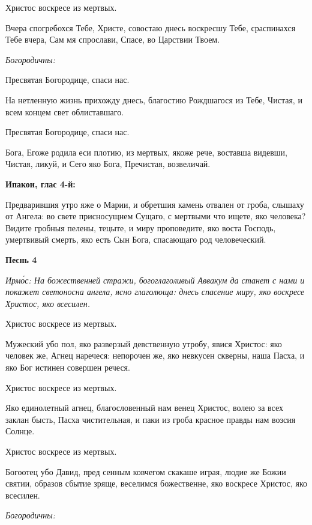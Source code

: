Христос воскресе из мертвых.


Вчера спогребохся Тебе, Христе, совостаю днесь воскресшу Тебе, сраспинахся Тебе вчера, Сам мя спрослави, Спасе, во Царствии Твоем.


\itshape Богородичны:

\normalfont{}


Пресвятая Богородице, спаси нас.


На нетленную жизнь прихожду днесь, благостию Рождшагося из Тебе, Чистая, и всем концем свет облиставшаго.


Пресвятая Богородице, спаси нас.


Бога, Егоже родила еси плотию, из мертвых, якоже рече, воставша видевши, Чистая, ликуй, и Сего яко Бога, Пречистая, возвеличай.





\bfseries Ипакои, глас 4-й:\normalfont{}


Предварившия утро яже о Марии, и обретшия камень отвален от гроба, слышаху от Ангела: во свете присносущнем Сущаго, с мертвыми что ищете, яко человека? Видите гробныя пелены, тецыте, и миру проповедите, яко воста Господь, умертвивый смерть, яко есть Сын Бога, спасающаго род человеческий.





\bfseries Песнь 4\normalfont{}


\itshape Ирмо́с:\normalfont{} На божественней стражи, богоглаголивый Аввакум да станет с нами и покажет светоносна ангела, ясно глаголюща: днесь спасение миру, яко воскресе Христос, яко всесилен.


Христос воскресе из мертвых.


Мужеский убо пол, яко разверзый девственную утробу, явися Христос: яко человек же, Агнец наречеся: непорочен же, яко невкусен скверны, наша Пасха, и яко Бог истинен совершен речеся.


Христос воскресе из мертвых.


Яко единолетный агнец, благословенный нам венец Христос, волею за всех заклан бысть, Пасха чистительная, и паки из гроба красное правды нам возсия Солнце.


Христос воскресе из мертвых.


Богоотец убо Давид, пред сенным ковчегом скакаше играя, людие же Божии святии, образов сбытие зряще, веселимся божественне, яко воскресе Христос, яко всесилен.


\itshape Богородичны:

